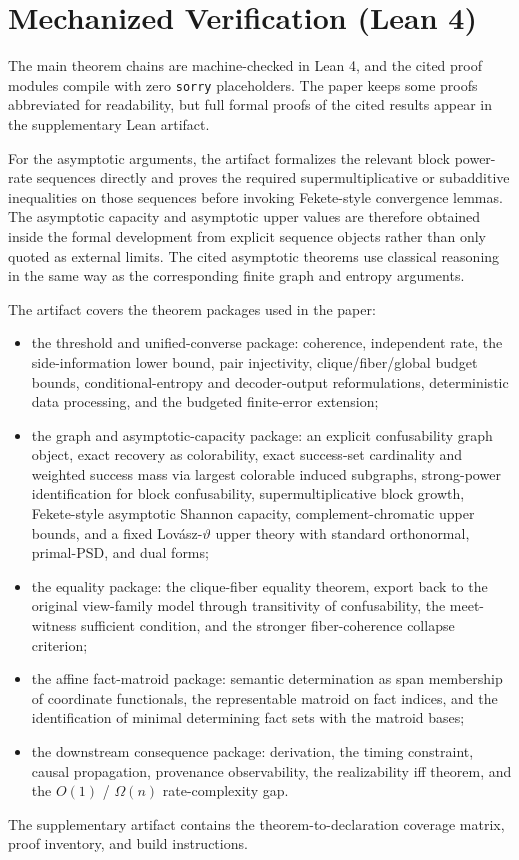 \section*{Mechanized Verification (Lean 4)}\label{sec:lean}

The main theorem chains are machine-checked in Lean 4, and the cited proof modules compile with zero \texttt{sorry} placeholders. The paper keeps some proofs abbreviated for readability, but full formal proofs of the cited results appear in the supplementary Lean artifact.

For the asymptotic arguments, the artifact formalizes the relevant block power-rate sequences directly and proves the required supermultiplicative or subadditive inequalities on those sequences before invoking Fekete-style convergence lemmas. The asymptotic capacity and asymptotic upper values are therefore obtained inside the formal development from explicit sequence objects rather than only quoted as external limits. The cited asymptotic theorems use classical reasoning in the same way as the corresponding finite graph and entropy arguments.

The artifact covers the theorem packages used in the paper:
\begin{itemize}
\item the threshold and unified-converse package: coherence, independent rate, the side-information lower bound, pair injectivity, clique/fiber/global budget bounds, conditional-entropy and decoder-output reformulations, deterministic data processing, and the budgeted finite-error extension;
\item the graph and asymptotic-capacity package: an explicit confusability graph object, exact recovery as colorability, exact success-set cardinality and weighted success mass via largest colorable induced subgraphs, strong-power identification for block confusability, supermultiplicative block growth, Fekete-style asymptotic Shannon capacity, complement-chromatic upper bounds, and a fixed Lov\'asz-$\vartheta$ upper theory with standard orthonormal, primal-PSD, and dual forms;
\item the equality package: the clique-fiber equality theorem, export back to the original view-family model through transitivity of confusability, the meet-witness sufficient condition, and the stronger fiber-coherence collapse criterion;
\item the affine fact-matroid package: semantic determination as span membership of coordinate functionals, the representable matroid on fact indices, and the identification of minimal determining fact sets with the matroid bases;
\item the downstream consequence package: derivation, the timing constraint, causal propagation, provenance observability, the realizability iff theorem, and the $O(1)$ / $\Omega(n)$ rate-complexity gap.
\end{itemize}

The supplementary artifact contains the theorem-to-declaration coverage matrix, proof inventory, and build instructions.
